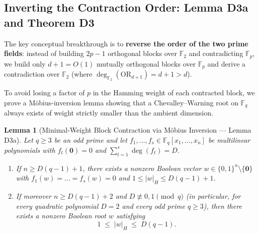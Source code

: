 \documentclass[11pt,a4paper]{article}
\newtheorem{lemma}[theorem]{Lemma}
\theoremstyle{definition}
\newcommand{\F}{\mathbb{F}}
\newcommand{\OR}{\mathrm{OR}}
\begin{document}
\subsection{Inverting the Contraction Order: Lemma D3a and Theorem D3}

The key conceptual breakthrough is to \textbf{reverse the order of the two prime fields}: instead of building $2p-1$ orthogonal blocks over $\F_2$ and contradicting $\F_p$, we build only $d + 1 = O(1)$ mutually orthogonal blocks over $\F_p$ and derive a contradiction over $\F_2$ (where $\deg_{\F_2}(\OR_{d+1}) = d + 1 > d$).

To avoid losing a factor of $p$ in the Hamming weight of each contracted block, we prove a M{\"o}bius-inversion lemma showing that a Chevalley--Warning root on $\F_q$ always exists of weight strictly smaller than the ambient dimension.

\begin{lemma}[Minimal-Weight Block Contraction via M{\"o}bius Inversion --- Lemma D3a]
\label{lem:d3a}
Let $q \ge 3$ be an odd prime and let $f_1,\dots,f_s \in \F_q[x_1,\dots,x_n]$ be multilinear polynomials with $f_t(\mathbf{0}) = 0$ and $\sum_{t=1}^s \deg(f_t) = D$.
\begin{enumerate}[leftmargin=*,nosep]
  \item If $n \ge D(q - 1) + 1$, there exists a nonzero Boolean vector $w \in \{0,1\}^n \setminus \{\mathbf{0}\}$ with $f_1(w) = \dots = f_s(w) = 0$ and $1 \le |w|_H \le D(q - 1) + 1$.
  \item If moreover $n \ge D(q - 1) + 2$ and $D \not\equiv 0, 1 \pmod q$ (in particular, for every quadratic polynomial $D = 2$ and every odd prime $q \ge 3$), then there exists a nonzero Boolean root $w$ satisfying
  \[
    1 \;\le\; |w|_H \;\le\; D(q - 1).
  \]
\end{enumerate}
\end{lemma}
\end{document}
